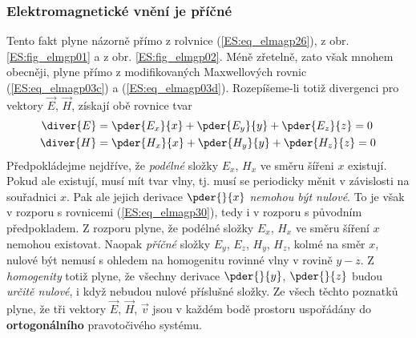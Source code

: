       \subsubsection{Elektromagnetické vnění je příčné}
        Tento fakt plyne názorně přímo z rolvnice (\ref{ES:eq_elmagp26}), z obr. 
        \ref{ES:fig_elmgp01} a z obr. \ref{ES:fig_elmgp02}. Méně zřetelně, zato však mnohem 
        obecněji, plyne přímo z modifikovaných Maxwellových rovnic (\ref{ES:eq_elmagp03c}) a 
        (\ref{ES:eq_elmagp03d}). Rozepíšeme-li totiž divergenci pro vektory \(\vec{E}\), 
        \(\vec{H}\), získají obě rovnice tvar
        \begin{subequations}
          \begin{align}\label{ES:eq_elmagp30}
            \diver{E} &= \pder{E_x}{x} + \pder{E_y}{y} + \pder{E_z}{z} = 0   \nonumber \\
            \diver{H} &= \pder{H_x}{x} + \pder{H_y}{y} + \pder{H_z}{z} = 0
          \end{align}
        \end{subequations}
        Předpokládejme nejdříve, že \emph{podélné} složky \(E_x\), \(H_x\) ve směru šířeni \(x\) 
        existují. Pokud ale existují, musí mít tvar vlny, tj. musí se periodicky měnit v závislosti 
        na souřadnici \(x\). Pak ale jejich derivace \(\pder{}{x}\) \emph{nemohou být nulové}. To 
        je však v rozporu s rovnicemi (\ref{ES:eq_elmagp30}), tedy i v rozporu s původním 
        předpokladem. Z rozporu plyne, že podélné složky \(E_x\), \(H_x\) ve směru šíření \(x\) 
        nemohou existovat. Naopak \emph{příčné} složky \(E_y\), \(E_z\), \(H_y\), \(H_z\), kolmé na 
        směr \(x\), nulové být nemusí s ohledem na homogenitu rovinné vlny v rovině \(y-z\). Z 
        \emph{homogenity} totiž plyne, že všechny derivace \(\pder{}{y}\), \(\pder{}{z}\) 
        budou \emph{určitě nulové}, i když nebudou nulové příslušné složky. Ze všech těchto 
        poznatků plyne, že tři vektory \(\vec{E}\), \(\vec{H}\), \(\vec{v}\) jsou v každém bodě 
        prostoru uspořádány do \textbf{ortogonálního} pravotočivého systému. 

